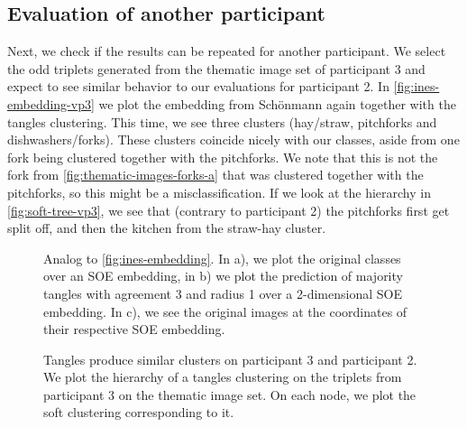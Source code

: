 \subsection{Evaluation of another participant}
Next, we check if the results can be repeated for another participant. 
We select the odd triplets generated from the thematic image set of participant 3 and expect to see similar behavior to our evaluations for participant 2. 
In \autoref{fig:ines-embedding-vp3} we plot the embedding
from Schönmann again together with the tangles clustering. This time, we see three clusters (hay/straw, pitchforks and dishwashers/forks). These clusters coincide nicely
with our classes, aside from one fork being clustered together with the pitchforks. We note that this is not the fork from \autoref{fig:thematic-images-forks-a} that was clustered together 
with the pitchforks, so this might be a misclassification. 
If we look at the hierarchy in \autoref{fig:soft-tree-vp3}, we see that (contrary to participant 2) the pitchforks first get split off, 
and then the kitchen from the straw-hay cluster. 

\begin{figure}[ht]
    \centering
    \hfill
    \caption{
        Analog to \autoref{fig:ines-embedding}. In a), we plot the original classes over an SOE embedding, in b) we plot the prediction of majority tangles with agreement 3 and radius 1 over 
        a 2-dimensional SOE embedding. In c), we see the original images at the coordinates of their respective SOE embedding.
    }
    \label{fig:ines-embedding-vp3}
\end{figure}

\begin{figure}[ht]
    \centering
    \caption{
        Tangles produce similar clusters on participant 3 and participant 2. We plot the hierarchy of a tangles clustering on the triplets from participant 3 on the thematic image set. 
        On each node, we plot the soft clustering corresponding to it.
    }
    \label{fig:soft-tree-vp3}
\end{figure}

